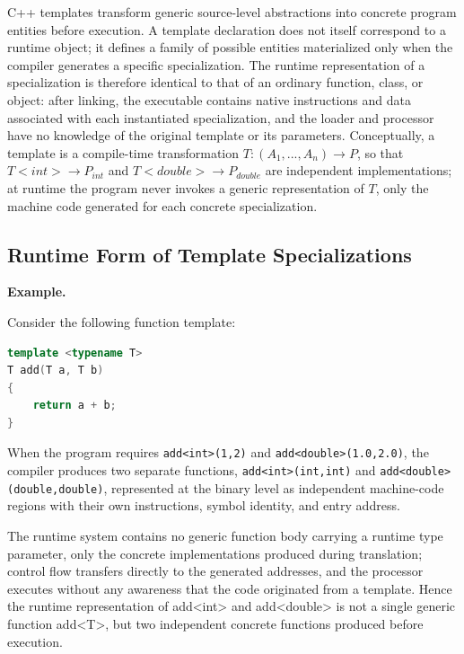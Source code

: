 \documentclass[11pt]{report}
\begin{document}
C++ templates transform generic source-level abstractions into concrete program
entities before execution. A template declaration does not itself correspond to a
runtime object; it defines a family of possible entities materialized only when
the compiler generates a specific specialization. The runtime representation of a
specialization is therefore identical to that of an ordinary function, class, or
object: after linking, the executable contains native instructions and data
associated with each instantiated specialization, and the loader and processor
have no knowledge of the original template or its parameters. Conceptually, a
template is a compile-time transformation
$T : (A_1, ..., A_n) \rightarrow P$, so that $T{<}int{>} \rightarrow P_{int}$ and
$T{<}double{>} \rightarrow P_{double}$ are independent implementations; at runtime
the program never invokes a generic representation of $T$, only the machine code
generated for each concrete specialization.

\subsection{Runtime Form of Template Specializations}
\label{CppTemplates:RuntimeRepresentation:Form}

\begin{examplebox}
\textbf{Example.}

Consider the following function template:

\begin{lstlisting}[language=C++]
template <typename T>
T add(T a, T b)
{
    return a + b;
}
\end{lstlisting}

When the program requires \texttt{add<int>(1,2)} and \texttt{add<double>(1.0,2.0)},
the compiler produces two separate functions, \texttt{add<int>(int,int)} and
\texttt{add<double>(double,double)}, represented at the binary level as independent
machine-code regions with their own instructions, symbol identity, and entry
address.
\end{examplebox}

The runtime system contains no generic function body carrying a runtime
type parameter, only the concrete implementations produced during translation;
control flow transfers directly to the generated addresses, and the processor
executes without any awareness that the code originated from a template. 
Hence the runtime representation of add<int> and add<double> is not a single
generic function add<T>, but two independent concrete functions produced
before execution.
\end{document}
